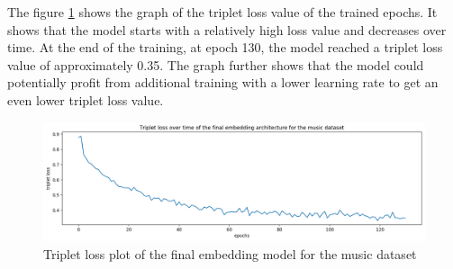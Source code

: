 \newline
The figure \ref{fig:Triplet-Loss-Music} shows the graph of the triplet loss value of the trained epochs. It shows that the model starts with a relatively high loss value and decreases over time. At the end of the training, at epoch 130, the model reached a triplet loss value of approximately 0.35. The graph further shows that the model could potentially profit from additional training with a lower learning rate to get an even lower triplet loss value.
\begin{figure}[ht]
\centering
    \includegraphics[width=0.95\linewidth]{img/triplet_loss_music_final.png}
    \caption{Triplet loss plot of the final embedding model for the music dataset}
    \label{fig:Triplet-Loss-Music}
\end{figure}

